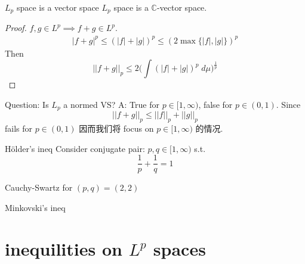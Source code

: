 \documentclass[lang=cn,11pt]{elegantbook}
\begin{document}
\begin{lemma}{$L_p$ space is a vector space}
    $L_p$ space is a $\mathbb{C}$-vector space.
\end{lemma}
\begin{proof}
    $f, g\in L^p \implies f+g \in L^p$.\\
    \begin{align}
        |f+ g|^p   \leq (|f| + |g| )^p \leq (2 \max\{|f|, |g|\})^p 
    \end{align}
    Then \[
    ||f + g||_p \leq 2\Big(\int (|f| + |g|)^p \; d\mu  \Big)^{\frac{1}{p}}
    \]
\end{proof}

Question: Is $L_p$ a normed VS?
A: True for $p\in [1,\infty)$, false for $p\in (0,1)$. 
Since \[
||f + g||_p \leq ||f||_p + ||g||_p
\] fails for $p \in (0,1)$
因而我们将 focus on $p \in [1,\infty)$ 的情况.

\begin{theorem}{Hölder's ineq}
    Consider conjugate pair: $p,q \in [1,\infty)$ s.t.  \[
    \frac{1}{p} + \frac{1}{q} = 1
    \]
    
\end{theorem}

\begin{remark}
    Cauchy-Swartz for $(p,q) = (2,2)$
\end{remark}

\begin{theorem}{Minkovski's ineq}
    
\end{theorem}










\chapter{inequilities on $L^p$ spaces}
\end{document}
